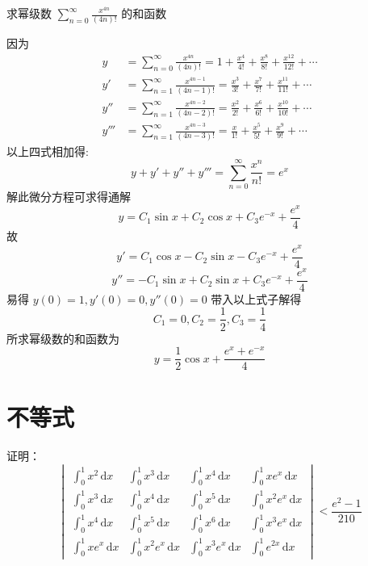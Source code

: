\documentclass[color=green,titlestyle=hang]{elegantbook}%
\begin{document}
\begin{example}
求幂级数 $\sum_{n=0}^{\infty}\frac{x^{4n}}{(4n)!}$ 的和函数
\end{example}\begin{solution}
因为
\begin{align*}
y&=\sum_{n=0}^{\infty}\frac{x^{4n}}{(4n)!}=1+\frac{x^4}{4!}+\frac{x^8}{8!}+\frac{x^{12}}{12!}+\cdots\\
y'&=\sum_{n=1}^{\infty}\frac{x^{4n-1}}{(4n-1)!}=\frac{x^3}{3!}+\frac{x^7}{7!}+\frac{x^{11}}{11!}+\cdots\\
y''&=\sum_{n=1}^{\infty}\frac{x^{4n-2}}{(4n-2)!}=\frac{x^2}{2!}+\frac{x^6}{6!}+\frac{x^{10}}{10!}+\cdots\\
y'''&=\sum_{n=1}^{\infty}\frac{x^{4n-3}}{(4n-3)!}=\frac{x}{1!}+\frac{x^5}{5!}+\frac{x^9}{9!}+\cdots
\end{align*}
以上四式相加得:
\[y+y'+y''+y'''=\sum_{n=0}^{\infty}\frac{x^{n}}{n!}=e^x\]
解此微分方程可求得通解
\[y=C_1\sin x+C_2\cos x+C_3e^{-x}+\frac{e^x}{4}\]
故\[y'=C_1\cos x-C_2\sin x-C_3e^{-x}+\frac{e^x}{4}\]
\[y''=-C_1\sin x+C_2\sin x+C_3e^{-x}+\frac{e^x}{4}\]
易得 $y(0)=1,y'(0)=0,y''(0)=0$ 带入以上式子解得
\[C_1=0,C_2=\frac{1}{2},C_3=\frac{1}{4}\]
所求幂级数的和函数为
\[y=\frac{1}{2}\cos x+\frac{e^x+e^{-x}}{4}\]
\end{solution}

\chapter{不等式}

\begin{exercise}
证明：\begin{equation*}\begin{vmatrix}
\int_{0}^{1}x^2\,\mathrm{d}x&\int_{0}^{1}x^3\,\mathrm{d}x &\int_{0}^{1}x^4\,\mathrm{d}x&\int_{0}^{1}xe^x\,\mathrm{d}x\\[4mm]
\int_{0}^{1}x^3\,\mathrm{d}x&\int_{0}^{1}x^4\,\mathrm{d}x &\int_{0}^{1}x^5\,\mathrm{d}x&\int_{0}^{1}x^2e^x\,\mathrm{d}x\\[4mm]
\int_{0}^{1}x^4\,\mathrm{d}x&\int_{0}^{1}x^5\,\mathrm{d}x &\int_{0}^{1}x^6\,\mathrm{d}x&\int_{0}^{1}x^3e^x\,\mathrm{d}x\\[4mm]
\int_{0}^{1}xe^x\,\mathrm{d}x&\int_{0}^{1}x^2e^x\,\mathrm{d}x&\int_{0}^{1}x^3e^x\,\mathrm{d}x&\int_{0}^{1}e^{2x}\,\mathrm{d}x
\end{vmatrix}<\frac{e^2-1}{210}\end{equation*}					
\end{exercise}\begin{Solution}
\end{Solution}
\end{document}
